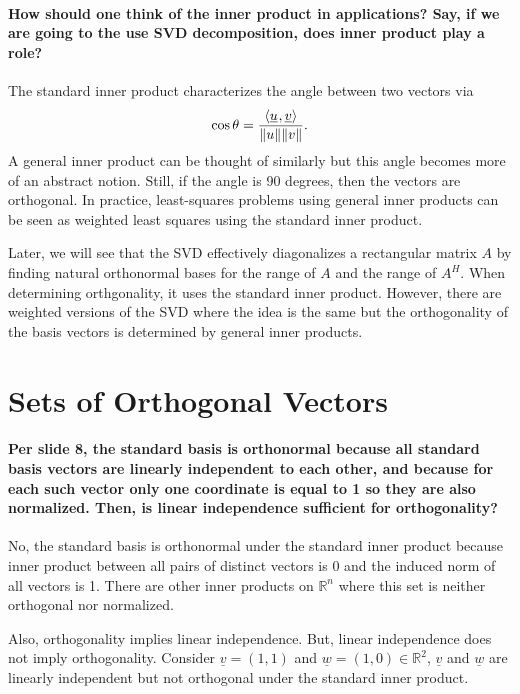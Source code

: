 \documentclass[10pt,english]{article}
\begin{document}
\paragraph{How should one think of the inner product in applications? Say, if we are going to the use SVD decomposition, does inner product play a role?}

The standard inner product characterizes the angle between two vectors via \[ \cos \theta = \frac{{\langle  \underline{u}  \mskip1mu ,  \underline{v}  \rangle}}{\|u\| \|v \|}. \]
A general inner product can be thought of similarly but this angle becomes more of an abstract notion.
Still, if the angle is 90 degrees, then the vectors are orthogonal.
In practice, least-squares problems using general inner products can be seen as weighted least squares using the standard inner product.

Later, we will see that the SVD effectively diagonalizes a rectangular matrix $A$ by finding natural orthonormal bases for the range of $A$ and the range of $A^H$.
When determining orthgonality, it uses the standard inner product.
However, there are weighted versions of the SVD where the idea is the same but the orthogonality of the basis vectors is determined by general inner products.





\section{Sets of Orthogonal Vectors}

\paragraph{Per slide 8, the standard basis is orthonormal because all standard basis vectors are linearly independent to each other, and because for each such vector only one coordinate is equal to 1 so they are also normalized. Then, is linear independence sufficient for orthogonality?}

No, the standard basis is orthonormal under the standard inner product because inner product between all pairs of distinct vectors is 0 and the induced norm of all vectors is 1.
There are other inner products on $\mathbb{R}^n$ where this set is neither orthogonal nor normalized.

Also, orthogonality implies linear independence.
But, linear independence does not imply orthogonality. Consider $\underline{v} = (1,1)$ and $\underline{w} = (1, 0) \in \mathbb{R}^2$, $\underline{v}$ and $\underline{w}$ are linearly independent but not orthogonal under the standard inner product.
\end{document}
